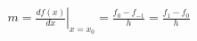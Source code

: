 \documentclass[preview]{standalone}
\begin{document}
\begin{align*}
m =\left.\frac{df(x)}{dx}\right|_{x=x_{0}} =\frac{f_{0} - f_{-1}}{h} =\frac{f_{1} - f_{0}}{h}
\end{align*}
\end{document}
